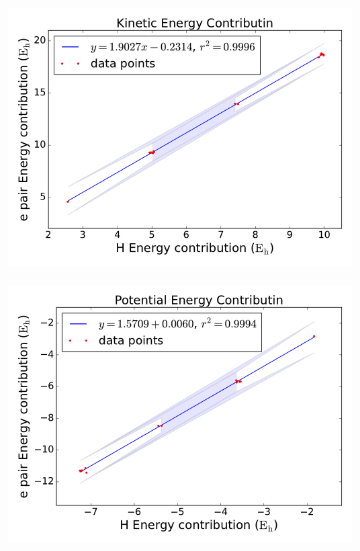 \begin{figure}[hb]
     \centering
     \begin{subfigure}[b]{0.32\textwidth}
         \centering
         \includegraphics[width=\textwidth]{4/plots/promelf/rl_t1_t2}
     \end{subfigure}
     \hfill
     \begin{subfigure}[b]{0.32\textwidth}
         \centering
         \includegraphics[width=\textwidth]{4/plots/promelf/rl_v1_v2}
     \end{subfigure}
     \hfill
     \begin{subfigure}[b]{0.32\textwidth}
         \centering

\end{subfigure}
\end{figure}
